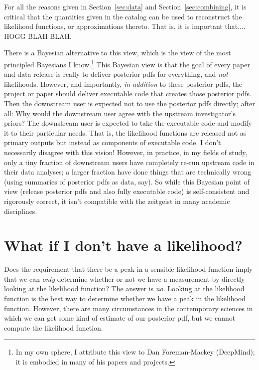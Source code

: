 \documentclass{article}
\newcommand{\sectionname}{Section}
\newcommand{\secref}[1]{\sectionname~\ref{#1}}
\begin{document}
For all the reasons given in \secref{sec:data} and \secref{sec:combining}, it is critical that the quantities given in the catalog can be used to reconstruct the likelihood functions, or approximations thereto.
That is, it is important that....
HOGG BLAH BLAH.

There is a Bayesian alternative to this view, which is the view of the most principled Bayesians I know.\footnote{In my own sphere, I attribute this view to Dan Foreman-Mackey (DeepMind); it is embodied in many of his papers and projects.}
This Bayesian view is that the goal of every paper and data release is really to deliver posterior pdfs for everything, and \emph{not} likelihoods.
However, and importantly, \emph{in addition} to these posterior pdfs, the project or paper should deliver executable code that creates those posterior pdfs.
Then the downstream user is expected not to use the posterior pdfs directly; after all:
Why would the downstream user agree with the upstream investigator's priors?
The downstream user is expected to take the executable code and modify it to their particular needs.
That is, the likelihood functions are released not as primary outputs but instead as components of executable code.
I don't necessarily disagree with this vision!
However, in practice, in my fields of study, only a tiny fraction of downstream users have completely re-run upstream code in their data analyses; a larger fraction have done things that are technically wrong (using summaries of posterior pdfs as data, say).
So while this Bayesian point of view (release posterior pdfs and also fully executable code) is self-consistent and rigorously correct, it isn't compatible with the zeitgeist in many academic disciplines.

\section{What if I don't have a likelihood?}\label{sec:lfi}
Does the requirement that there be a peak in a sensible likelihood function imply that we can \emph{only} determine whether or not we have a measurement by directly looking at the likelihood function?
The answer is \emph{no}.
Looking at the likelihood function is the best way to determine whether we have a peak in the likelihood function.
However, there are many circumstances in the contemporary sciences in which we can get some kind of estimate of our posterior pdf, but we cannot compute the likelihood function.
\end{document}
